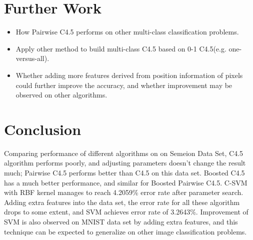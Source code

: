 \documentclass[a4paper,11pt]{article}
\begin{document}
\section{Further Work}
\begin{itemize}
 \item How Pairwise C4.5 performs on other multi-class classification problems.
 \item Apply other method to build multi-class C4.5 based on 0-1 C4.5(e.g. one-versus-all).
 \item Whether adding more features derived from position information of pixels could further improve the accuracy, and whether improvement may be observed on other algorithms.
\end{itemize}
\section{Conclusion}
Comparing performance of different algorithms on on Semeion Data Set, C4.5 algorithm performs poorly, and adjusting parameters doesn't change the result much; Pairwise C4.5 performs better than C4.5 on this data set. Boosted C4.5 has a much better performance, and similar for Boosted Pairwise C4.5. C-SVM with RBF kernel manages to reach 4.2059\% error rate after parameter search. Adding extra features into the data set, the error rate for all these algorithm drops to some extent, and SVM achieves error rate of 3.2643\%. Improvement of SVM is also observed on MNIST data set by adding extra features, and this technique can be expected to generalize on other image classification problems.

\newpage


\end{document}
